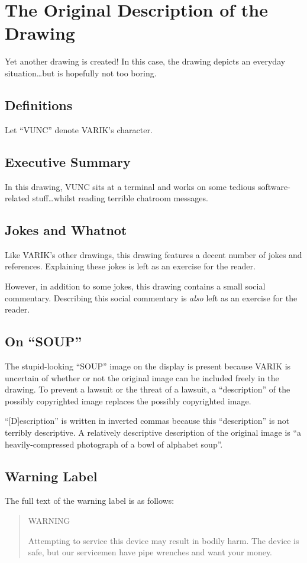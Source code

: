 \documentclass{report}
\begin{document}
\section{The Original Description of the Drawing}
Yet another drawing is created!
In this case, the drawing depicts an everyday situation\ldots but is hopefully not too boring.

\subsection{Definitions}
Let ``VUNC'' denote VARIK's character.

\subsection{Executive Summary}
In this drawing, VUNC sits at a terminal and works on some tedious software-related stuff\ldots whilst reading terrible chatroom messages.
\subsection{Jokes and Whatnot}
Like VARIK's other drawings, this drawing features a decent number of jokes and references.  Explaining these jokes is left as an exercise for the reader.

However, in addition to some jokes, this drawing contains a small social commentary.  Describing this social commentary is \textit{also} left as an exercise for the reader.
\subsection{On ``SOUP''}
The stupid-looking ``SOUP'' image on the display is present because VARIK is uncertain of whether or not the original image can be included freely in the drawing.  To prevent a lawsuit or the threat of a lawsuit, a ``description'' of the possibly copyrighted image replaces the possibly copyrighted image.

``[D]escription'' is written in inverted commas because this ``description'' is not terribly descriptive.  A relatively descriptive description of the original image is ``a heavily-compressed photograph of a bowl of alphabet soup''.
\subsection{Warning Label}
The full text of the warning label is as follows:
\begin{quote}
	WARNING

	Attempting to service this device may result in bodily harm.  The device is safe, but our servicemen have pipe wrenches and want your money.
\end{quote}
\end{document}
